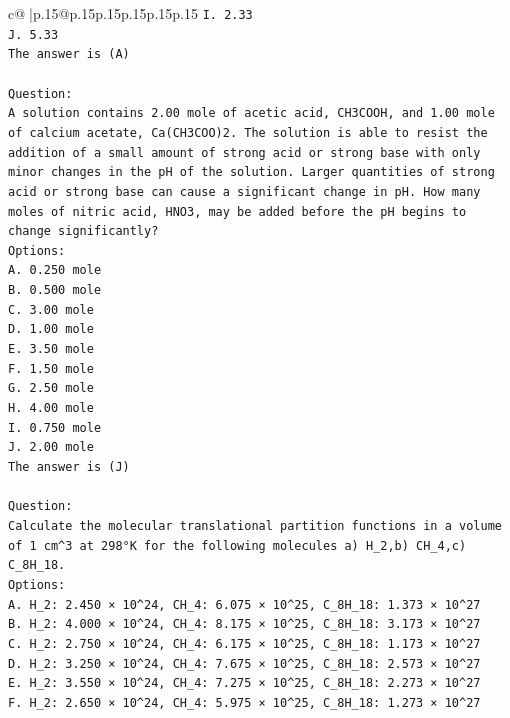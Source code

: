 \documentclass{article}
\begin{document}
{\begin{supertabular}{c@{$\;$}|p{.15\linewidth}@{}p{.15\linewidth}p{.15\linewidth}p{.15\linewidth}p{.15\linewidth}p{.15\linewidth}}
{{{\texttt{I. 2.33} \\
\texttt{J. 5.33} \\
\texttt{The answer is (A)} \\
\\ 
\texttt{Question:} \\
\texttt{A solution contains 2.00 mole of acetic acid, CH3COOH, and 1.00 mole of calcium acetate, Ca(CH3COO)2. The solution is able to resist the addition of a small amount of strong acid or strong base with only minor changes in the pH of the solution. Larger quantities of strong acid or strong base can cause a significant change in pH. How many moles of nitric acid, HNO3, may be added before the pH begins to change significantly?} \\
\texttt{Options:} \\
\texttt{A. 0.250 mole} \\
\texttt{B. 0.500 mole} \\
\texttt{C. 3.00 mole} \\
\texttt{D. 1.00 mole} \\
\texttt{E. 3.50 mole} \\
\texttt{F. 1.50 mole} \\
\texttt{G. 2.50 mole} \\
\texttt{H. 4.00 mole} \\
\texttt{I. 0.750 mole} \\
\texttt{J. 2.00 mole} \\
\texttt{The answer is (J)} \\
\\ 
\texttt{Question:} \\
\texttt{Calculate the molecular translational partition functions in a volume of 1 cm\^{}3 at 298°K for the following molecules a) H\_2,b) CH\_4,c) C\_8H\_18.} \\
\texttt{Options:} \\
\texttt{A. H\_2: 2.450 × 10\^{}24, CH\_4: 6.075 × 10\^{}25, C\_8H\_18: 1.373 × 10\^{}27} \\
\texttt{B. H\_2: 4.000 × 10\^{}24, CH\_4: 8.175 × 10\^{}25, C\_8H\_18: 3.173 × 10\^{}27} \\
\texttt{C. H\_2: 2.750 × 10\^{}24, CH\_4: 6.175 × 10\^{}25, C\_8H\_18: 1.173 × 10\^{}27} \\
\texttt{D. H\_2: 3.250 × 10\^{}24, CH\_4: 7.675 × 10\^{}25, C\_8H\_18: 2.573 × 10\^{}27} \\
\texttt{E. H\_2: 3.550 × 10\^{}24, CH\_4: 7.275 × 10\^{}25, C\_8H\_18: 2.273 × 10\^{}27} \\
\texttt{F. H\_2: 2.650 × 10\^{}24, CH\_4: 5.975 × 10\^{}25, C\_8H\_18: 1.273 × 10\^{}27} \\
}}}
\end{supertabular}}
\end{document}
